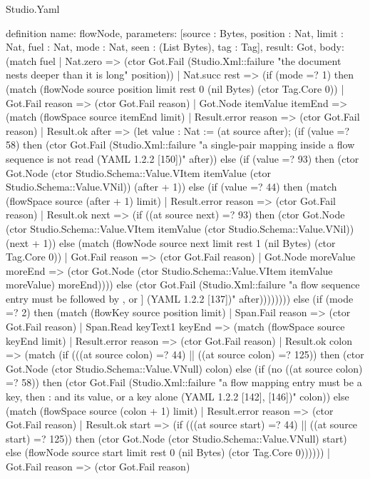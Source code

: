 \begin{lexlean}{Studio.Yaml}
\begin{semanticmodule}
definition{
  name: flowNode,
  parameters: [source : Bytes, position : Nat, limit : Nat, fuel : Nat, mode : Nat, seen : (List Bytes), tag : Tag],
  result: Got,
  body: (match fuel
    | Nat.zero => (ctor Got.Fail (Studio.Xml::failure "the document nests deeper than it is long" position))
    | Nat.succ rest => (if (mode =? 1) then (match (flowNode source position limit rest 0 (nil Bytes) (ctor Tag.Core 0))
      | Got.Fail reason => (ctor Got.Fail reason)
      | Got.Node itemValue itemEnd => (match (flowSpace source itemEnd limit)
        | Result.error reason => (ctor Got.Fail reason)
        | Result.ok after => (let value : Nat := (at source after); (if (value =? 58) then (ctor Got.Fail (Studio.Xml::failure "a single-pair mapping inside a flow sequence is not read (YAML 1.2.2 [150])" after)) else (if (value =? 93) then (ctor Got.Node (ctor Studio.Schema::Value.VItem itemValue (ctor Studio.Schema::Value.VNil)) (after + 1)) else (if (value =? 44) then (match (flowSpace source (after + 1) limit)
          | Result.error reason => (ctor Got.Fail reason)
          | Result.ok next => (if ((at source next) =? 93) then (ctor Got.Node (ctor Studio.Schema::Value.VItem itemValue (ctor Studio.Schema::Value.VNil)) (next + 1)) else (match (flowNode source next limit rest 1 (nil Bytes) (ctor Tag.Core 0))
            | Got.Fail reason => (ctor Got.Fail reason)
            | Got.Node moreValue moreEnd => (ctor Got.Node (ctor Studio.Schema::Value.VItem itemValue moreValue) moreEnd)))) else (ctor Got.Fail (Studio.Xml::failure "a flow sequence entry must be followed by , or ] (YAML 1.2.2 [137])" after)))))))) else (if (mode =? 2) then (match (flowKey source position limit)
      | Span.Fail reason => (ctor Got.Fail reason)
      | Span.Read keyText1 keyEnd => (match (flowSpace source keyEnd limit)
        | Result.error reason => (ctor Got.Fail reason)
        | Result.ok colon => (match (if (((at source colon) =? 44) || ((at source colon) =? 125)) then (ctor Got.Node (ctor Studio.Schema::Value.VNull) colon) else (if (no ((at source colon) =? 58)) then (ctor Got.Fail (Studio.Xml::failure "a flow mapping entry must be a key, then : and its value, or a key alone (YAML 1.2.2 [142], [146])" colon)) else (match (flowSpace source (colon + 1) limit)
          | Result.error reason => (ctor Got.Fail reason)
          | Result.ok start => (if (((at source start) =? 44) || ((at source start) =? 125)) then (ctor Got.Node (ctor Studio.Schema::Value.VNull) start) else (flowNode source start limit rest 0 (nil Bytes) (ctor Tag.Core 0))))))
            | Got.Fail reason => (ctor Got.Fail reason)
}
\end{semanticmodule}
\end{lexlean}
